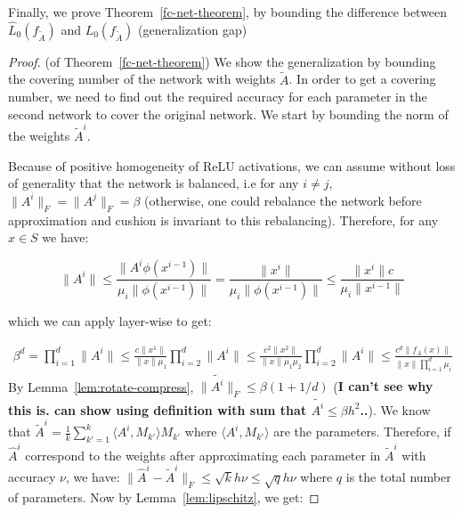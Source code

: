 
Finally, we prove Theorem~\ref{fc-net-theorem}, by bounding the difference between $\hat{L}_0(f_{\tilde{A}})$ and $L_0(f_{\tilde{A}})$ (generalization gap)

\begin{proof}(of Theorem~\ref{fc-net-theorem})
    We show the generalization by bounding the covering number of the network with weights $\tilde{A}$.
In order to get a covering number, we need to find out the required accuracy for each parameter in the second network to cover the original network. We start by bounding the norm of the weights $\tilde{A}^i$.

    Because of positive homogeneity of ReLU activations, we can assume without loss of generality that the network is balanced, i.e for any $i\neq j$, $\|A^i\|_F = \|A^j\|_F=\beta$ (otherwise, one could rebalance the network before approximation and cushion is invariant to this rebalancing). Therefore, for any $x\in S$ we have:
    
    $$\|A^i\| \leq \frac{\|A^i\phi(x^{i-1})\|}{\mu_i\|\phi(x^{i-1})\|} = \frac{\|x^i\|}{\mu_i\|\phi(x^{i-1})\|} \leq \frac{\|x^i\|c}{\mu_i\|x^{i-1}\|}$$
    
    which we can apply layer-wise to get:
    
    \begin{align*}
    \beta^d = \prod_{i=1}^d\|A^i\| \leq \frac{c\|x^1\|}{\|x\| \mu_1}\prod_{i=2}^d\|A^i\|\leq \frac{c^2\|x^2\|}{\|x\| \mu_1\mu_2}\prod_{i=2}^d\|A^i\|\leq \frac{c^{d} \|f_A(x)\|}{\|x\|\prod_{i=1}^d \mu_i}
    \end{align*}
    By Lemma~\ref{lem:rotate-compress}, $\|\tilde{A^i}\|_F \leq \beta(1+1/d)$ (\textbf{I can't see why this is. can show using definition with sum that $\tilde{A^i} \leq \beta h^2$..}). We know that $\tilde{A}^i = \frac{1}{k}\sum_{k'=1}^k \langle A^i, M_{k'}\rangle M_{k'}$ where $\langle A^i, M_{k'}\rangle$ are the parameters. Therefore, if $\hat{A}^i$ correspond to the weights after approximating each parameter in $\tilde{A}^i$ with accuracy $\nu$, we have:
    $\|\hat{A}^i-\tilde{A}^i\|_F \leq \sqrt{k}h\nu \leq \sqrt{q}h\nu$ where $q$ is the total number of parameters. Now by Lemma~\ref{lem:lipschitz}, we get:


\end{proof}
